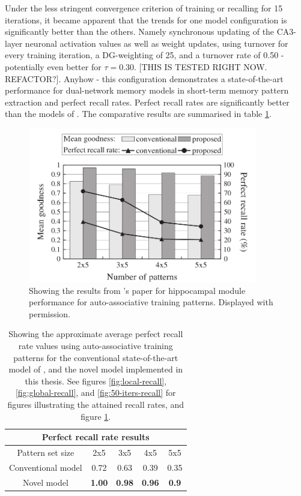 Under the less stringent convergence criterion of training or recalling for 15 iterations, it became apparent that the trends for one model configuration is significantly better than the others. Namely synchronous updating of the CA3-layer neuronal activation values as well as weight updates, using turnover for every training iteration, a DG-weighting of 25, and a turnover rate of 0.50 - potentially even better for $\tau=0.30$. [THIS IS TESTED RIGHT NOW. REFACTOR?].
Anyhow - this configuration demonstrates a state-of-the-art performance for dual-network memory models in short-term memory pattern extraction and perfect recall rates. Perfect recall rates are significantly better than the models of \citep{Hattori2014, Hattori2010}. The comparative results are summarised in table \ref{table:comparison-perfect-recall-rates}.

\begin{figure}
    \centering
    \includegraphics[width=10cm]{fig/fig6_hattori2014}
    \caption{Showing the results from \citeauthor{Hattori2014}'s \citeyear{Hattori2014} paper for hippocampal module performance for auto-associative training patterns. Displayed with permission.}
    \label{fig:fig6_hattori14}
\end{figure}

\begin{table}[]
\centering
\caption{Showing the approximate average perfect recall rate values using auto-associative training patterns for the conventional state-of-the-art model of \citep{Hattori2014}, and the novel model implemented in this thesis. See figures \ref{fig:local-recall}, \ref{fig:global-recall}, and \ref{fig:50-iters-recall} for figures illustrating the attained recall rates, and figure \ref{fig:fig6_hattori14}.}
\label{table:comparison-perfect-recall-rates}
\begin{tabular}{|c|c|c|c|c|}
\hline
\multicolumn{5}{|c|}{Perfect recall rate results}                                         \\ \hline
Pattern set size   & 2x5           & 3x5           & 4x5           & 5x5           \\ \hline
Conventional model & 0.72 & 0.63 & 0.39 & 0.35 \\ \hline
Novel model        & \textbf{1.00} & \textbf{0.98} & \textbf{0.96} & \textbf{0.9}  \\ \hline
\end{tabular}
\end{table}




